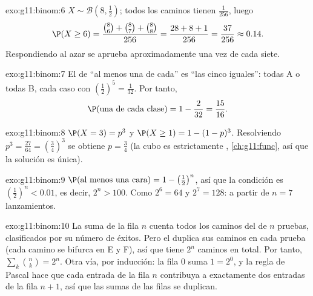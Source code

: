 \begin{solution}{exo:g11:binom:6}
$X \sim \mathcal B\left(8, \frac12\right)$; todos los caminos tienen
 $\frac{1}{256}$, luego
\[
\P(X \geq 6) = \frac{\binom86 + \binom87 + \binom88}{256}
= \frac{28 + 8 + 1}{256} = \frac{37}{256} \approx 0.14 .
\]
Respondiendo al azar se aprueba aproximadamente una vez de cada siete.
\end{solution}

\begin{solution}{exo:g11:binom:7}
El  de ``al menos una de cada'' es ``las cinco iguales'':
todas A o todas B, cada caso con 
$\left(\frac12\right)^5 = \frac1{32}$. Por tanto,
\[
\P(\text{una de cada clase}) = 1 - \frac{2}{32} = \frac{15}{16} .
\]
\end{solution}

\begin{solution}{exo:g11:binom:8}
$\P(X = 3) = p^3$ y $\P(X \geq 1) = 1 - (1-p)^3$. Resolviendo
$p^3 = \frac{27}{64} = \left(\frac34\right)^3$ se obtiene $p = \frac34$
(la  cubo es estrictamente , \cref{ch:g11:func}, así que
la solución es única).
\end{solution}

\begin{solution}{exo:g11:binom:9}
$\P(\text{al menos una cara}) = 1 - \left(\frac12\right)^n$, así que la
condición es $\left(\frac12\right)^n < 0.01$, es decir, $2^n > 100$. Como
$2^6 = 64$ y $2^7 = 128$: a partir de $n = 7$ lanzamientos.
\end{solution}

\begin{solution}{exo:g11:binom:10}
La suma de la fila $n$ cuenta todos los caminos del  de $n$ pruebas,
clasificados por su número de éxitos. Pero el  duplica sus caminos en
cada prueba (cada camino se bifurca en E y F), así que tiene $2^n$ caminos
en total. Por tanto, $\sum_{k} \binom nk = 2^n$. Otra vía, por inducción:
la fila $0$ suma $1 = 2^0$, y la regla de Pascal hace que cada entrada de
la fila $n$ contribuya a exactamente dos entradas de la fila $n+1$, así
que las sumas de las filas se duplican.
\end{solution}

